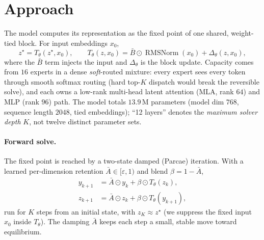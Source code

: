 \documentclass[11pt]{article}
\newcommand{\RMSNorm}{\operatorname{RMSNorm}}
\begin{document}
\section{Approach}
\label{sec:impl}

The model computes its representation as the fixed point of one shared, weight-tied
block. For input embeddings $x_0$,
\[
z^\star = T_\theta(z^\star, x_0),
\qquad
T_\theta(z,x_0) = \bar B \odot \RMSNorm(x_0) + \Delta_\theta(z, x_0),
\]
where the $\bar B$ term injects the input and $\Delta_\theta$ is the block update.
Capacity comes from $16$ experts in a dense \emph{soft}-routed mixture: every expert
sees every token through smooth softmax routing (hard top-$K$ dispatch would break
the reversible solve), and each owns a low-rank multi-head latent attention
(MLA, rank $64$) and MLP (rank $96$) path. The model totals $13.9$\,M parameters
(model dim $768$, sequence length $2048$, tied embeddings); ``12 layers'' denotes the
\emph{maximum solver depth} $K$, not twelve distinct parameter sets.

\paragraph{Forward solve.} The fixed point is reached by a two-state damped (Parcae)
iteration. With a learned per-dimension retention $\bar A \in [\varepsilon,1)$ and
blend $\beta = 1-\bar A$,
\[
\begin{aligned}
y_{k+1} &= \bar A \odot y_k + \beta \odot T_\theta(z_k),\\
z_{k+1} &= \bar A \odot z_k + \beta \odot T_\theta(y_{k+1}),
\end{aligned}
\]
run for $K$ steps from an initial state, with $z_K \approx z^\star$ (we suppress the
fixed input $x_0$ inside $T_\theta$). The damping $\bar A$ keeps each step a small,
stable move toward equilibrium.
\end{document}
